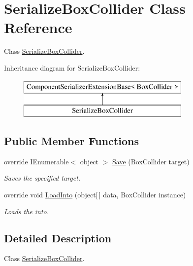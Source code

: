 \hypertarget{class_serialize_box_collider}{}\section{Serialize\+Box\+Collider Class Reference}
\label{class_serialize_box_collider}


Class \hyperlink{class_serialize_box_collider}{Serialize\+Box\+Collider}.  


Inheritance diagram for Serialize\+Box\+Collider\+:\begin{figure}[H]
\begin{center}
\leavevmode
\includegraphics[height=2.000000cm]{class_serialize_box_collider}
\end{center}
\end{figure}
\subsection*{Public Member Functions}
\begin{DoxyCompactItemize}
\item 
override I\+Enumerable$<$ object $>$ \hyperlink{class_serialize_box_collider_a221fddae2d26e61cf659f0f684fdec59}{Save} (Box\+Collider target)
\begin{DoxyCompactList}\small\item\em Saves the specified target. \end{DoxyCompactList}\item 
override void \hyperlink{class_serialize_box_collider_a4e2d9de367e71f67ae907db73c2978a7}{Load\+Into} (object\mbox{[}$\,$\mbox{]} data, Box\+Collider instance)
\begin{DoxyCompactList}\small\item\em Loads the into. \end{DoxyCompactList}\end{DoxyCompactItemize}


\subsection{Detailed Description}
Class \hyperlink{class_serialize_box_collider}{Serialize\+Box\+Collider}. 



